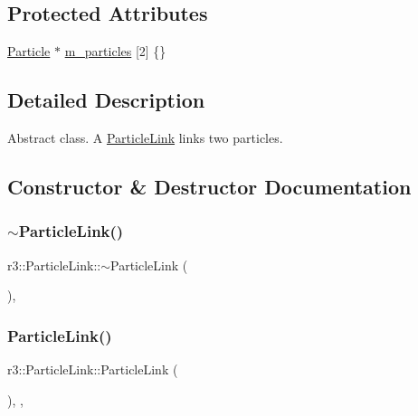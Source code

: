 \subsection*{Protected Attributes}
\begin{DoxyCompactItemize}
\item 
\mbox{\hyperlink{classr3_1_1_particle}{Particle}} $\ast$ \mbox{\hyperlink{classr3_1_1_particle_link_a2794d7fe45d905d9c11bb79be3d8e3c8}{m\+\_\+particles}} \mbox{[}2\mbox{]} \{\}
\end{DoxyCompactItemize}


\subsection{Detailed Description}
Abstract class. A \mbox{\hyperlink{classr3_1_1_particle_link}{Particle\+Link}} links two particles. 

\subsection{Constructor \& Destructor Documentation}
\mbox{\label{classr3_1_1_particle_link_a4477af9dbe9041010985492df2656e55}} 
\subsubsection{\texorpdfstring{$\sim$\+Particle\+Link()}{~ParticleLink()}}
{\footnotesize\ttfamily r3\+::\+Particle\+Link\+::$\sim$\+Particle\+Link (\begin{DoxyParamCaption}{ }\end{DoxyParamCaption})\hspace{0.3cm}{\ttfamily [virtual]}, {\ttfamily [default]}}

\mbox{\label{classr3_1_1_particle_link_adc17e9225ff4f49803f5d5fe0a117af2}} 
\subsubsection{\texorpdfstring{Particle\+Link()}{ParticleLink()}}
{\footnotesize\ttfamily r3\+::\+Particle\+Link\+::\+Particle\+Link (\begin{DoxyParamCaption}{ }\end{DoxyParamCaption})\hspace{0.3cm}{\ttfamily [explicit]}, {\ttfamily [protected]}, {\ttfamily [default]}}




